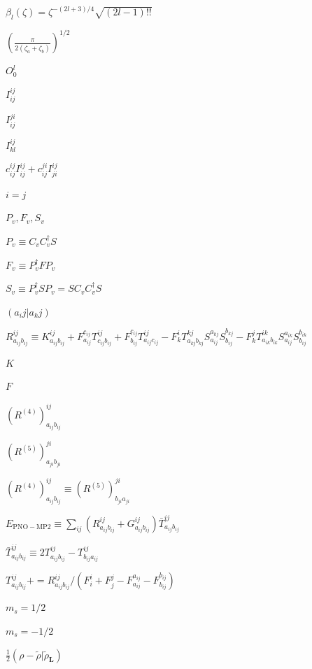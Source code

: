 \documentclass{article}
\begin{document}
$ \beta_l(\zeta) = \zeta^{-(2l+3)/4} \sqrt{(2l-1)!!} $
\pagebreak

$ \left(\frac{\pi}{2(\zeta_a+\zeta_b)}\right)^{1/2} $
\pagebreak

$ O^l_0 $
\pagebreak

$ I^{ij}_{ij} $
\pagebreak

$ I^{ji}_{ij} $
\pagebreak

$ I^{ij}_{kl} $
\pagebreak

$ c^{ij}_{ij} I^{ij}_{ij} + c^{ji}_{ij} I^{ij}_{ji} $
\pagebreak

$ i=j $
\pagebreak

$ {P_v, F_v, S_v} $
\pagebreak

$ P_v \equiv C_v C_v^\dagger S $
\pagebreak

$ F_v \equiv P_v^\dagger F P_v $
\pagebreak

$ S_v \equiv P_v^\dagger S P_v = S C_v C_v^\dagger S $
\pagebreak

$ (a_ij|a_kj) $
\pagebreak

$ R^{ij}_{a_{ij} b_{ij}} \equiv K^{ij}_{a_{ij} b_{ij}} + F^{c_{ij}}_{a_{ij}} T^{ij}_{c_{ij} b_{ij}} + F^{c_{ij}}_{b_{ij}} T^{ij}_{a_{ij} c_{ij}} - F^i_k T^{kj}_{a_{kj} b_{kj}} S^{a_{kj}}_{a_{ij}} S^{b_{kj}}_{b_{ij}} - F^j_k T^{ik}_{a_{ik} b_{ik}} S^{a_{ik}}_{a_{ij}} S^{b_{ik}}_{b_{ij}} $
\pagebreak

$ K $
\pagebreak

$ F $
\pagebreak

$ \left(R^{(4)}\right)^{ij}_{a_{ij} b_{ij}} $
\pagebreak

$ \left(R^{(5)}\right)^{ji}_{a_{ji} b_{ji}} $
\pagebreak

$ \left(R^{(4)}\right)^{ij}_{a_{ij} b_{ij}} \equiv \left(R^{(5)}\right)^{ji}_{b_{ji} a_{ji}} $
\pagebreak

$ E_\mathrm{PNO-MP2} \equiv \sum_{ij} \left( R^{ij}_{a_{ij} b_{ij}} + G^{ij}_{a_{ij} b_{ij}} \right) \bar{T}^{ij}_{a_{ij} b_{ij}} $
\pagebreak

$ \bar{T}^{ij}_{a_{ij} b_{ij}} \equiv 2 T^{ij}_{a_{ij} b_{ij}} - T^{ij}_{b_{ij} a_{ij}} $
\pagebreak

$ T^{ij}_{a_{ij} b_{ij}} += R^{ij}_{a_{ij} b_{ij}} / (F^i_i + F^j_j - F^{a_{ij}}_{a_{ij}} - F^{b_{ij}}_{b_{ij}}) $
\pagebreak

$ m_s = 1/2 $
\pagebreak

$ m_s = -1/2 $
\pagebreak

$ \frac{1}{2} (\rho - \tilde{\rho}|\tilde{\rho}_\mathbf{L}) $
\pagebreak
\end{document}
